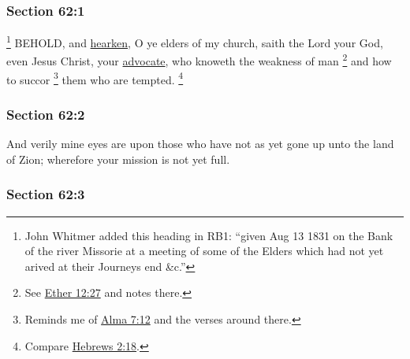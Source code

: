 	\subsubsection{Section 62:1} %
		\label{DC62-1}

			\footnote{%
				John Whitmer added this heading in RB1: ``given Aug 13 1831 on the Bank of the river Missorie at a meeting of some of the Elders which had not yet arived at their Journeys end \&c.''
				}%
		BEHOLD, and \hyperref[HEARKEN]{hearken}, O ye elders of my church, saith the Lord your God, even Jesus Christ, your \hyperref[ADVOCATE]{advocate}, who knoweth the weakness of man%
			\footnote{%
				See \hyperref[ETHER-12-27]{Ether 12:27} and notes there.
				}
		and how to succor%
			\footnote{%
				Reminds me of \hyperref[ALMA-7-12]{Alma 7:12} and the verses around there.
				}
		them who are tempted.%
			\footnote{%
				Compare \hyperref[HEBREWS-2-18]{Hebrews 2:18}.
				}


	\subsubsection{Section 62:2} %
		\label{DC62-2}

		And verily mine eyes are upon those who have not as yet gone up unto the land of Zion; wherefore your mission is not yet full.


	\subsubsection{Section 62:3} %
		\label{DC62-3}

